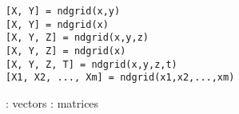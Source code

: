 \begin{mandesc}
\end{mandesc}

\begin{calling_sequence}
\begin{verbatim}
[X, Y] = ndgrid(x,y)
[X, Y] = ndgrid(x)
[X, Y, Z] = ndgrid(x,y,z)
[X, Y, Z] = ndgrid(x)
[X, Y, Z, T] = ndgrid(x,y,z,t)
[X1, X2, ..., Xm] = ndgrid(x1,x2,...,xm)
\end{verbatim}
\end{calling_sequence}

\begin{parameters}
  \begin{varlist}
    : vectors
    : matrices
\end{varlist}
\end{parameters}

